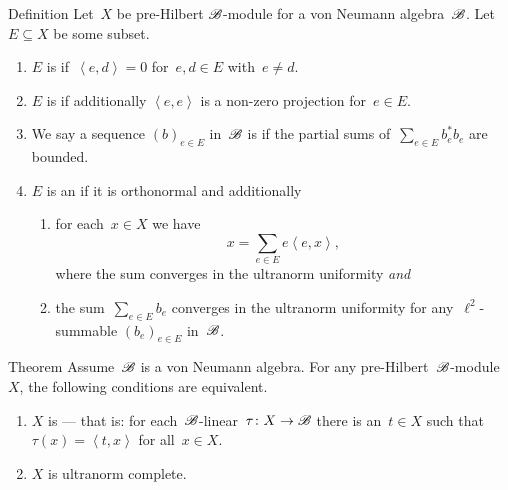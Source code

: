 \documentclass[b]{subfiles}
\begin{document}
\begin{parsec}%
\begin{point}{Definition}
    Let~$X$ be pre-Hilbert $\mathscr{B}$-module
        for a von Neumann algebra~$\mathscr{B}$.
    Let~$E \subseteq X$ be some subset.
    \begin{enumerate}
        \item $E$ is  if~$\left<e,d\right> = 0$
            for~$e,d \in E$ with~$e \neq d$.
        \item $E$ is  if additionally
                    $\left<e,e\right>$ is a non-zero projection
                    for~$e \in E$.
        \item We say a sequence $(b)_{e \in E}$ in~$\mathscr{B}$
                is 
                if the partial sums of~$\sum_{e \in E} b_e^*b_e$
                are bounded.
        \item $E$ is an  if
                it is orthonormal and additionally
            \begin{enumerate}
                \item for each~$x \in X$ we have
                    \begin{equation*}
                        x = \sum_{e \in E} e\left<e,x\right>,
                    \end{equation*}
                    where the sum converges in the ultranorm uniformity
                    \emph{and}
                \item  the sum~$\sum_{e \in E} b_e$
                        converges in the ultranorm uniformity
                    for any~$\ell^2$-summable $(b_e)_{e \in E}$
                        in~$\mathscr{B}$.
            \end{enumerate}
    \end{enumerate}
\end{point}
\begin{point}{Theorem}%
    Assume~$\mathscr{B}$ is a von Neumann algebra.
    For any pre-Hilbert~$\mathscr{B}$-module~$X$,
        the following conditions are equivalent.
        \begin{enumerate}
            \item $X$ is  ---
                that is: for each~$\mathscr{B}$-linear~$\tau\colon X \to \mathscr{B}$
                there is an~$t \in X$ such that~$\tau(x) = \left<t,x\right>$
                    for all~$x \in X$.
            \item $X$ is ultranorm complete.

\end{enumerate}
\end{point}
\end{parsec}
\end{document}
